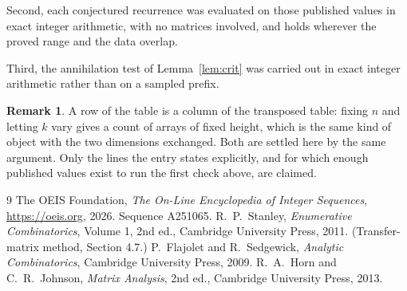 \documentclass[11pt,a4paper]{article}
\theoremstyle{plain}
\theoremstyle{definition}
\newtheorem{remark}[theorem]{Remark}
\begin{document}
Second, each conjectured recurrence was evaluated on those published values in exact
integer arithmetic, with no matrices involved, and holds wherever the proved range and the
data overlap.

Third, the annihilation test of Lemma~\ref{lem:crit} was carried out in exact integer
arithmetic rather than on a sampled prefix.

\begin{remark}
A row of the table is a column of the transposed table: fixing $n$ and letting $k$ vary gives a
count of arrays of fixed height, which is the same kind of object with the two dimensions
exchanged. Both are settled here by the same argument. Only the lines the entry states
explicitly, and for which enough published values exist to run the first check above, are
claimed.
\end{remark}

\begin{thebibliography}{9}
 The OEIS Foundation, \emph{The On-Line Encyclopedia of Integer
Sequences}, \url{https://oeis.org}, 2026. Sequence A251065.
 R.~P.~Stanley, \emph{Enumerative Combinatorics}, Volume 1, 2nd ed.,
Cambridge University Press, 2011. (Transfer-matrix method, Section 4.7.)
 P.~Flajolet and R.~Sedgewick, \emph{Analytic Combinatorics}, Cambridge
University Press, 2009.
 R.~A.~Horn and C.~R.~Johnson, \emph{Matrix Analysis}, 2nd ed., Cambridge
University Press, 2013.
\end{thebibliography}
\end{document}
